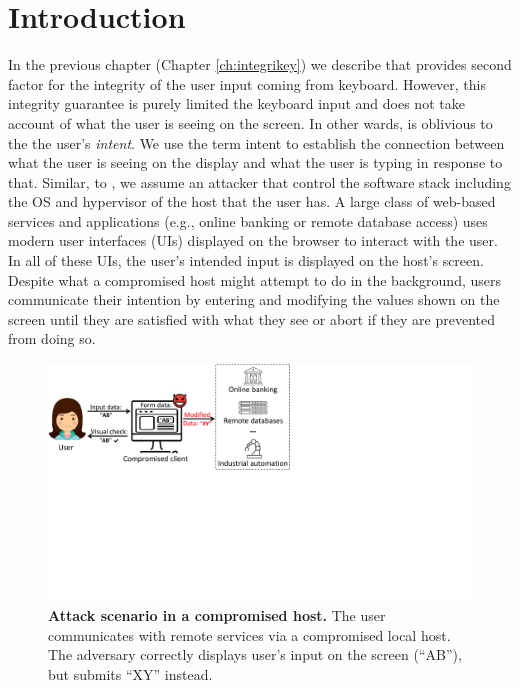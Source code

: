 \section{Introduction}
\label{integriscreen:sec:intro}

In the previous chapter (Chapter \ref{ch:integrikey}) we describe \integrikey that provides second factor for the integrity of the user input coming from keyboard. However, this integrity guarantee is purely limited the keyboard input and does not take account of what the user is seeing on the screen. In other wards, \integrikey is oblivious to the the user's \emph{intent}. We use the term intent to establish the connection between what the user is seeing on the display and what the user is typing in response to that. Similar, to \integrikey, we assume an attacker that control the software stack including the OS and hypervisor of the host that the user has. A large class of web-based services and applications (e.g., online banking or remote database access) uses modern user interfaces (UIs) displayed on the browser to interact with the user. In all of these UIs, the user's intended input is displayed on the host's screen. Despite what a compromised host might attempt to do in the background, users communicate their intention by entering and modifying the values shown on the screen until they are satisfied with what they see or abort if they are prevented from doing so.


\begin{figure}[t]
 \centering
\includegraphics[trim={0 10.4cm 14.4cm 0},clip,width=0.75\linewidth]{chapters/IntegriScreen/img/motivatingScenario.pdf}
\caption[Attack scenario in a compromised host]{\textbf{Attack scenario in a compromised host.}
 	The user communicates with remote services via a compromised local host. The adversary correctly displays user's input on the screen (``AB''), but submits ``XY'' instead.
 	}
 \label{fig:scenario}
\end{figure}



